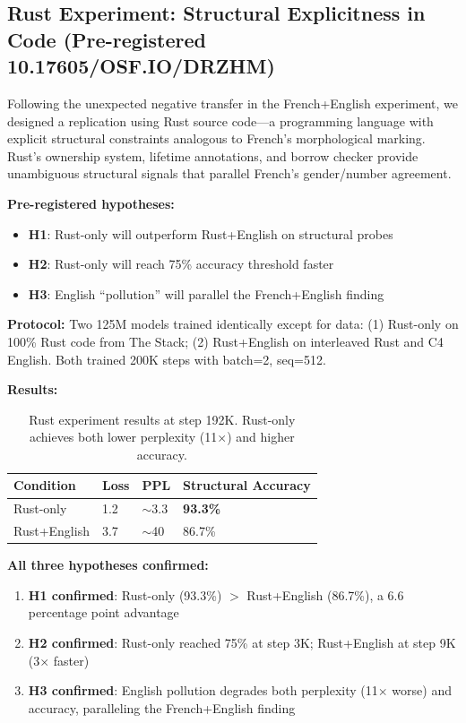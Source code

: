 \documentclass[11pt,a4paper]{article}
\begin{document}
\subsection{Rust Experiment: Structural Explicitness in Code (Pre-registered 10.17605/OSF.IO/DRZHM)}

Following the unexpected negative transfer in the French+English experiment, we designed a replication using Rust source code---a programming language with explicit structural constraints analogous to French's morphological marking. Rust's ownership system, lifetime annotations, and borrow checker provide unambiguous structural signals that parallel French's gender/number agreement.

\textbf{Pre-registered hypotheses:}
\begin{itemize}
    \item \textbf{H1}: Rust-only will outperform Rust+English on structural probes
    \item \textbf{H2}: Rust-only will reach 75\% accuracy threshold faster
    \item \textbf{H3}: English ``pollution'' will parallel the French+English finding
\end{itemize}

\textbf{Protocol:} Two 125M models trained identically except for data: (1) Rust-only on 100\% Rust code from The Stack; (2) Rust+English on interleaved Rust and C4 English. Both trained 200K steps with batch=2, seq=512.

\textbf{Results:}

\begin{table}[h]
\centering
\begin{tabular}{llll}
\toprule
Condition & Loss & PPL & Structural Accuracy \\
\midrule
Rust-only & 1.2 & $\sim$3.3 & \textbf{93.3\%} \\
Rust+English & 3.7 & $\sim$40 & 86.7\% \\
\bottomrule
\end{tabular}
\caption{Rust experiment results at step 192K. Rust-only achieves both lower perplexity (11$\times$) and higher accuracy.}
\label{tab:rust}
\end{table}

\textbf{All three hypotheses confirmed:}
\begin{enumerate}
    \item \textbf{H1 confirmed}: Rust-only (93.3\%) $>$ Rust+English (86.7\%), a 6.6 percentage point advantage
    \item \textbf{H2 confirmed}: Rust-only reached 75\% at step 3K; Rust+English at step 9K (3$\times$ faster)
    \item \textbf{H3 confirmed}: English pollution degrades both perplexity (11$\times$ worse) and accuracy, paralleling the French+English finding
\end{enumerate}
\end{document}
